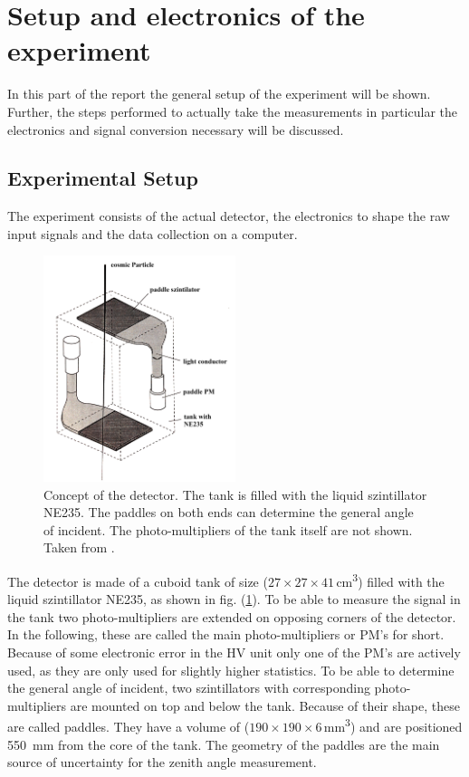 \section{Setup and electronics of the experiment} \label{sec:aufbau}

In this part of the report the general setup of the experiment will be shown.
Further, the steps performed to actually take the measurements in particular the electronics and signal conversion necessary will be discussed.

\subsection{Experimental Setup}

	The experiment consists of the actual detector, the electronics to shape the raw input signals and the data collection on a computer.

	\begin{figure}[ht]
		\centering
		\includegraphics[width=0.5\textwidth]{img/aufbau.jpg}
		\caption{Concept of the detector. 
			The tank is filled with the liquid szintillator NE235.
			The paddles on both ends can determine the general angle of incident.
			The photo-multipliers of the tank itself are not shown.
			Taken from \cite{wwu}.}
		\label{fig:detector}
	\end{figure}
	
	The detector is made of a cuboid tank of size ($27 \times 27 \times 41$\,\si{\centi\meter\cubed}) filled with the liquid szintillator NE235, as shown in fig. (\ref{fig:detector}).
	To be able to measure the signal in the tank two photo-multipliers are extended on opposing corners of the detector.
	In the following, these are called the main photo-multipliers or PM's for short.
	Because of some electronic error in the HV unit only one of the PM's are actively used, as they are only used for slightly higher statistics.
	To be able to determine the general angle of incident, two szintillators with corresponding photo-multipliers are mounted on top and below the tank.
	Because of their shape, these are called paddles.
	They have a volume of ($190 \times 190 \times 6$\,\si{\milli\meter\cubed}) and are positioned \SI{550}{\milli\meter} from the core of the tank.
	The geometry of the paddles are the main source of uncertainty for the zenith angle measurement.
	
